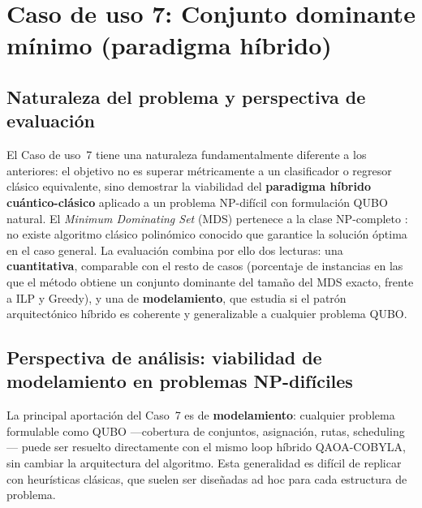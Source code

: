 \section{Caso de uso 7: Conjunto dominante mínimo (paradigma híbrido)}

\subsection{Naturaleza del problema y perspectiva de evaluación}

El Caso de uso~7 tiene una naturaleza fundamentalmente diferente a los anteriores: el objetivo no es superar métricamente a un clasificador o regresor clásico equivalente, sino demostrar la viabilidad del \textbf{paradigma híbrido cuántico-clásico} aplicado a un problema NP-difícil con formulación QUBO natural. El \textit{Minimum Dominating Set} (MDS) pertenece a la clase NP-completo \citep{garey1979}: no existe algoritmo clásico polinómico conocido que garantice la solución óptima en el caso general. La evaluación combina por ello dos lecturas: una \textbf{cuantitativa}, comparable con el resto de casos (porcentaje de instancias en las que el método obtiene un conjunto dominante del tamaño del MDS exacto, frente a ILP y Greedy), y una de \textbf{modelamiento}, que estudia si el patrón arquitectónico híbrido es coherente y generalizable a cualquier problema QUBO.

\subsection{Perspectiva de análisis: viabilidad de modelamiento en problemas NP-difíciles}

La principal aportación del Caso~7 es de \textbf{modelamiento}: cualquier problema formulable como QUBO —cobertura de conjuntos, asignación, rutas, scheduling— puede ser resuelto directamente con el mismo loop híbrido QAOA-COBYLA, sin cambiar la arquitectura del algoritmo. Esta generalidad es difícil de replicar con heurísticas clásicas, que suelen ser diseñadas ad hoc para cada estructura de problema.

